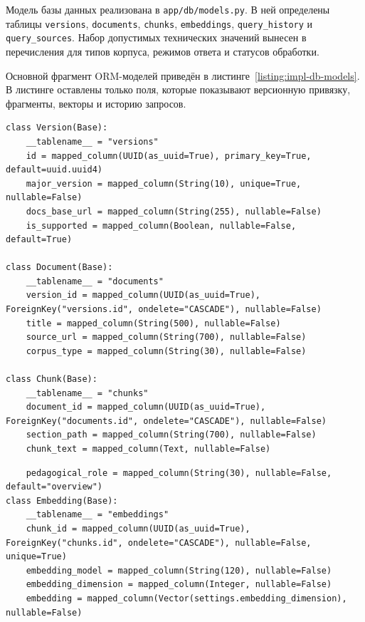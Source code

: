 Модель базы данных реализована в \texttt{app/db/models.py}. В ней определены таблицы \texttt{versions}, \texttt{documents}, \texttt{chunks}, \texttt{embeddings}, \texttt{query\_history} и \texttt{query\_sources}. Набор допустимых технических значений вынесен в перечисления для типов корпуса, режимов ответа и статусов обработки.

Основной фрагмент ORM-моделей приведён в листинге~\ref{listing:impl-db-models}. В листинге оставлены только поля, которые показывают версионную привязку, фрагменты, векторы и историю запросов.

\begin{listingblock}
\label{listing:impl-db-models}
\begin{verbatim}
class Version(Base):
    __tablename__ = "versions"
    id = mapped_column(UUID(as_uuid=True), primary_key=True, default=uuid.uuid4)
    major_version = mapped_column(String(10), unique=True, nullable=False)
    docs_base_url = mapped_column(String(255), nullable=False)
    is_supported = mapped_column(Boolean, nullable=False, default=True)

class Document(Base):
    __tablename__ = "documents"
    version_id = mapped_column(UUID(as_uuid=True), ForeignKey("versions.id", ondelete="CASCADE"), nullable=False)
    title = mapped_column(String(500), nullable=False)
    source_url = mapped_column(String(700), nullable=False)
    corpus_type = mapped_column(String(30), nullable=False)

class Chunk(Base):
    __tablename__ = "chunks"
    document_id = mapped_column(UUID(as_uuid=True), ForeignKey("documents.id", ondelete="CASCADE"), nullable=False)
    section_path = mapped_column(String(700), nullable=False)
    chunk_text = mapped_column(Text, nullable=False)
\end{verbatim}
\end{listingblock}

\begin{listingblock}
\begin{verbatim}
    pedagogical_role = mapped_column(String(30), nullable=False, default="overview")
class Embedding(Base):
    __tablename__ = "embeddings"
    chunk_id = mapped_column(UUID(as_uuid=True), ForeignKey("chunks.id", ondelete="CASCADE"), nullable=False, unique=True)
    embedding_model = mapped_column(String(120), nullable=False)
    embedding_dimension = mapped_column(Integer, nullable=False)
    embedding = mapped_column(Vector(settings.embedding_dimension), nullable=False)
\end{verbatim}
\end{listingblock}

